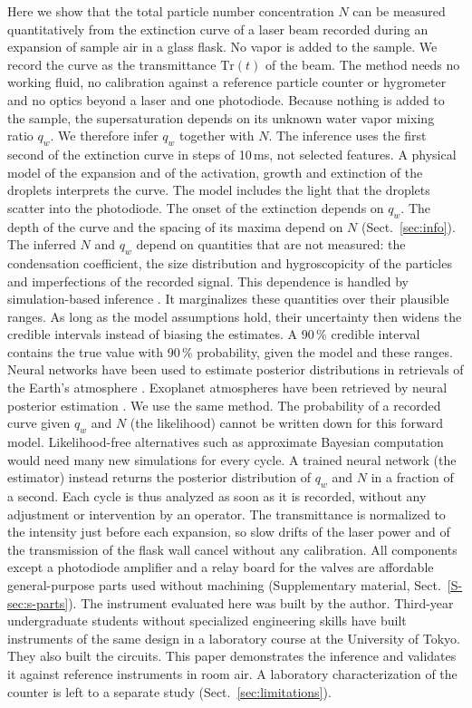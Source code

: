 \documentclass[preprint,review,12pt,authoryear]{elsarticle}
\begin{document}
Here we show that the total particle number concentration $N$ can be measured quantitatively from the
extinction curve of a laser beam recorded during an expansion of sample air in a glass flask. No vapor is
added to the sample. We record the curve as the transmittance $\mathrm{Tr}(t)$ of the beam.
The method needs no working fluid, no calibration against a reference particle counter or
hygrometer and no optics beyond a laser and one photodiode.
Because nothing is added to the sample, the supersaturation depends on its unknown water vapor mixing ratio
$q_w$. We therefore infer $q_w$ together with $N$.
The inference uses the first second of the extinction curve in steps of 10\,ms, not selected features. A
physical model of the expansion and of the activation, growth and extinction of the droplets interprets the
curve. The model includes the light that the droplets scatter into the photodiode.
The onset of the extinction depends on $q_w$. The depth of the curve and the spacing of its maxima depend on
$N$ (Sect.~\ref{sec:info}).
The inferred $N$ and $q_w$ depend on quantities that are not measured: the condensation coefficient,
the size distribution and hygroscopicity of the particles and imperfections of the recorded signal.
This dependence is handled by simulation-based inference \citep{cranmer2020frontier}.
It marginalizes these quantities over their plausible ranges. As long as the model assumptions hold, their
uncertainty then widens the credible intervals instead of biasing the estimates. A 90\,\%
credible interval contains the true
value with 90\,\% probability, given the model and these ranges.
Neural networks have been used to estimate posterior distributions in retrievals of the Earth's atmosphere
\citep{pfreundschuh2018neural}. Exoplanet atmospheres have been retrieved by neural posterior estimation
\citep{vasist2023neural}. We use the same method.
The probability of a recorded curve given $q_w$ and $N$ (the likelihood) cannot be written down for
this forward model. Likelihood-free alternatives such as approximate Bayesian computation would need
many new simulations for every cycle. A trained neural network (the estimator) instead returns the posterior
distribution of $q_w$ and $N$ in a fraction of a second.
Each cycle is thus analyzed as soon as it is recorded, without any adjustment or intervention by an operator.
The transmittance is normalized to the intensity just before each expansion, so slow drifts of the
laser power and of the transmission of the flask wall cancel without any calibration.
All components except a photodiode amplifier and a relay board for the valves are affordable
general-purpose parts used without machining (Supplementary material, Sect.~\ref{S-sec:s-parts}).
The instrument evaluated here was built by the author. Third-year undergraduate students without
specialized engineering skills have built instruments of the same design in a laboratory course at
the University of Tokyo. They also built the circuits.
This paper demonstrates the inference and validates it against reference instruments in room air.
A laboratory characterization of the counter is left to a separate study (Sect.~\ref{sec:limitations}).
\end{document}
